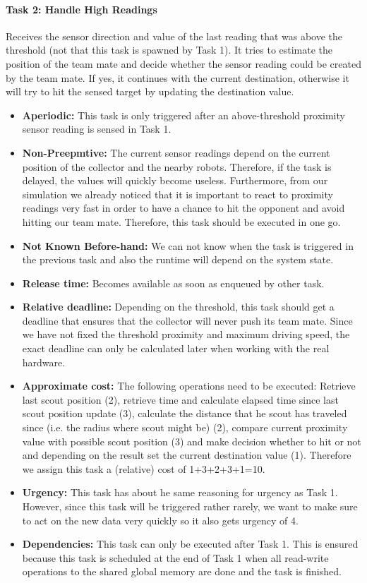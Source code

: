 \documentclass[12pt]{article}
\begin{document}
\paragraph{Task 2: Handle High Readings}
Receives the sensor direction and value of the last reading that was above the threshold (not that this task is spawned by Task 1). It tries to estimate the position of the team mate and decide whether the sensor reading could be created by the team mate. If yes, it continues with the current destination, otherwise it will try to hit the sensed target by updating the destination value.
  	\begin{itemize}
	\item \textbf{Aperiodic:} This task is only triggered after an above-threshold proximity sensor reading is sensed in Task 1.
	\item \textbf{Non-Preepmtive:} The current sensor readings depend on the current position of the collector and the nearby robots. Therefore, if the task is delayed, the values will quickly become useless. Furthermore, from our simulation we already noticed that it is important to react to proximity readings very fast in order to have a chance to hit the opponent and avoid hitting our team mate. Therefore, this task should be executed in one go.
  	\item \textbf{Not Known Before-hand:} We can not know when the task is triggered in the previous task and also the runtime will depend on the system state.
  	\item \textbf{Release time:} Becomes available as soon as enqueued by other task.
  	\item \textbf{Relative deadline:} Depending on the threshold, this task should get a deadline that ensures that the collector will never push its team mate. Since we have not fixed the threshold proximity and maximum driving speed, the exact deadline can only be calculated later when working with the real hardware.
  	\item \textbf{Approximate cost:} The following operations need to be executed: Retrieve last scout position (2), retrieve time and calculate elapsed time since last scout position update (3), calculate the distance that he scout has traveled since (i.e. the radius where scout might be) (2), compare current proximity value with possible scout position (3) and make decision whether to hit or not and depending on the result set the current destination value (1). Therefore we assign this task a (relative) cost of 1+3+2+3+1=10.
  	\item \textbf{Urgency:} This task has about he same reasoning for urgency as Task 1. However, since this task will be triggered rather rarely, we want to make sure to act on the new data very quickly so it also gets urgency of 4.
  	\item \textbf{Dependencies:} This task can only be executed after Task 1. This is ensured because this task is scheduled at the end of Task 1 when all read-write operations to the shared global memory are done and the task is finished.
   	\end{itemize}
\end{document}
